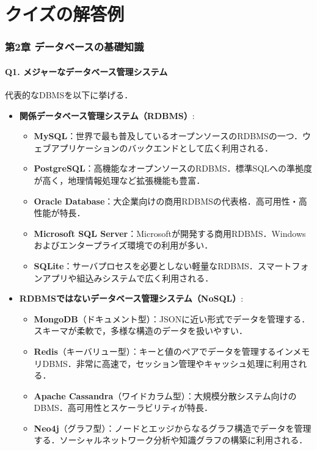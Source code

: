 \chapter{クイズの解答例}

\subsection*{第2章 データベースの基礎知識}

\subsubsection*{Q1. メジャーなデータベース管理システム}
代表的なDBMSを以下に挙げる．

\begin{itemize}
    \item \textbf{関係データベース管理システム（RDBMS）}:
    \begin{itemize}
        \item \textbf{MySQL}：世界で最も普及しているオープンソースのRDBMSの一つ．ウェブアプリケーションのバックエンドとして広く利用される．
        \item \textbf{PostgreSQL}：高機能なオープンソースのRDBMS．標準SQLへの準拠度が高く，地理情報処理など拡張機能も豊富．
        \item \textbf{Oracle Database}：大企業向けの商用RDBMSの代表格．高可用性・高性能が特長．
        \item \textbf{Microsoft SQL Server}：Microsoftが開発する商用RDBMS．Windowsおよびエンタープライズ環境での利用が多い．
        \item \textbf{SQLite}：サーバプロセスを必要としない軽量なRDBMS．スマートフォンアプリや組込みシステムで広く利用される．
    \end{itemize}
    \item \textbf{RDBMSではないデータベース管理システム（NoSQL）}:
    \begin{itemize}
        \item \textbf{MongoDB}（ドキュメント型）：JSONに近い形式でデータを管理する．スキーマが柔軟で，多様な構造のデータを扱いやすい．
        \item \textbf{Redis}（キーバリュー型）：キーと値のペアでデータを管理するインメモリDBMS．非常に高速で，セッション管理やキャッシュ処理に利用される．
        \item \textbf{Apache Cassandra}（ワイドカラム型）：大規模分散システム向けのDBMS．高可用性とスケーラビリティが特長．
        \item \textbf{Neo4j}（グラフ型）：ノードとエッジからなるグラフ構造でデータを管理する．ソーシャルネットワーク分析や知識グラフの構築に利用される．
    \end{itemize}
\end{itemize}

